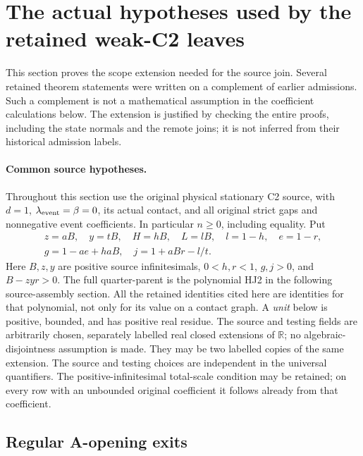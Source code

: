 \section{The actual hypotheses used by the retained weak-C2 leaves}
\label{sec:weak-c2-bare-source-audit}

This section proves the scope extension needed for the source join.
Several retained theorem statements were written on a complement of
earlier admissions.  Such a complement is not a mathematical
assumption in the coefficient calculations below.  The extension is
justified by checking the entire proofs, including the state normals
and the remote joins; it is not inferred from their historical
admission labels.

\paragraph{Common source hypotheses.}
Throughout this section use the original physical stationary C2
source, with \(d=1\), \(\lambda_{\rm event}=\beta=0\), its actual
contact, and all original strict gaps and nonnegative event
coefficients.  In particular \(n\geq0\), including equality.
Put
\[
\begin{gathered}
 z=aB,\quad y=tB,\quad H=hB,\quad L=lB,\quad
 l=1-h,\quad e=1-r,\\
 g=1-ae+haB,\quad j=1+aBr-l/t .
\end{gathered}
 \tag{BSR1}
\]
Here \(B,z,y\) are positive source infinitesimals, \(0<h,r<1\),
\(g,j>0\), and \(B-zyr>0\).
The full quarter-parent is the polynomial HJ2 in the following
source-assembly section.  All the retained identities cited here
are identities for that polynomial, not only for its value on a
contact graph.
A \emph{unit} below is positive, bounded, and has positive real
residue.  The source and testing fields are arbitrarily chosen,
separately labelled real closed extensions of \(\mathbb R\);
no algebraic-disjointness assumption is made.  They may be
two labelled copies of the same extension.  The source and
testing choices are independent in the universal quantifiers.
The positive-infinitesimal total-scale condition may be retained;
on every row with an unbounded original coefficient it follows
already from that coefficient.

\subsection{Regular A-opening exits}


